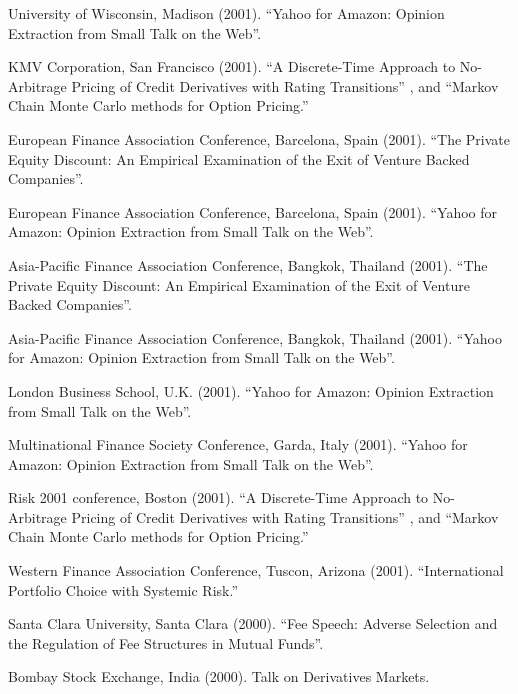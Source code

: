 \documentclass{article}
\begin{document}
\begin{etaremune}
{\item University of Wisconsin, Madison (2001).
``Yahoo for Amazon: Opinion Extraction from Small Talk on the Web''. 

\item KMV Corporation, San Francisco (2001).
 ``A Discrete-Time Approach to No-Arbitrage Pricing of Credit
Derivatives with Rating Transitions'' , and  
``Markov Chain Monte Carlo methods for Option Pricing.''

\item European Finance Association Conference, Barcelona, Spain (2001).
``The Private Equity Discount: An Empirical Examination of the
Exit of Venture Backed Companies''.

\item European Finance Association Conference, Barcelona, Spain (2001).
``Yahoo for Amazon: Opinion Extraction from Small Talk on the Web''. 

\item Asia-Pacific Finance Association Conference, Bangkok, Thailand (2001).
``The Private Equity Discount: An Empirical Examination of the
Exit of Venture Backed Companies''.

\item Asia-Pacific Finance Association Conference, Bangkok, Thailand (2001).
``Yahoo for Amazon: Opinion Extraction from Small Talk on the Web''. 

\item London Business School, U.K. (2001). 
``Yahoo for Amazon: Opinion Extraction from Small Talk on the Web''. 

\item Multinational Finance Society Conference, Garda, Italy (2001).
``Yahoo for Amazon: Opinion Extraction from Small Talk on the Web''. 

\item Risk 2001 conference, Boston (2001).
 ``A Discrete-Time Approach to No-Arbitrage Pricing of Credit
Derivatives with Rating Transitions'' , and  
``Markov Chain Monte Carlo methods for Option Pricing.''

\item Western Finance Association Conference, Tuscon, Arizona (2001).
``International Portfolio Choice with Systemic Risk.''

\item Santa Clara University, Santa Clara (2000). 
``Fee Speech: Adverse Selection and the Regulation of Fee 
Structures in Mutual Funds''. 

\item Bombay Stock Exchange, India (2000). Talk on Derivatives Markets.

}
\end{etaremune}
\end{document}
